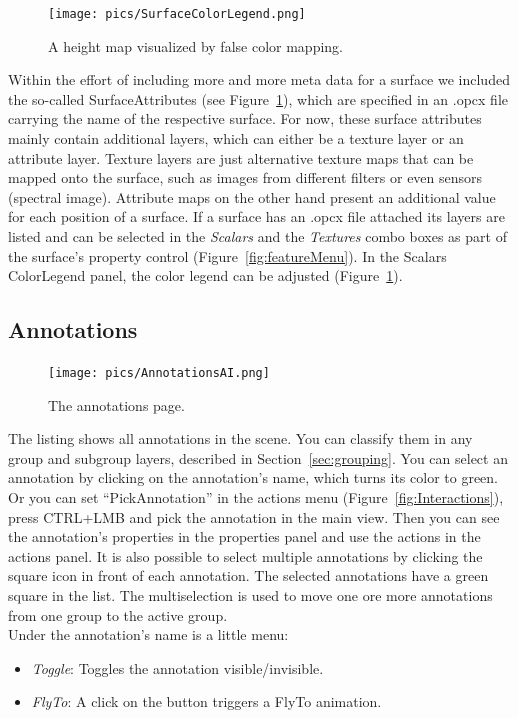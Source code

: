 \begin{figure}[h]
    	\centering
    		\texttt{[image: pics/SurfaceColorLegend.png]}
    	\caption[Surface Color Legend]{A height map visualized by false color mapping.}
    	\label{fig:surfaceColorLegend}
   \end{figure}
	
Within the effort of including more and more meta data for a surface we included the so-called SurfaceAttributes (see Figure~\ref{fig:surfaceColorLegend}),
which are specified in an .opcx file carrying the name of the respective surface.
For now, these surface attributes mainly contain additional layers, which can either be a texture layer or an attribute layer.
Texture layers are just alternative texture maps that can be mapped onto the surface, such as images from different filters or even sensors (spectral image). 
Attribute maps on the other hand present an additional value for each position of a surface. 
If a surface has an .opcx file attached its layers are listed and can be selected in the \textit{Scalars} and the \textit{Textures} combo boxes as part of the surface's property control (Figure~\ref{fig:featureMenu}). 
In the Scalars ColorLegend panel, the color legend can be adjusted (Figure~\ref{fig:surfaceColorLegend}).

\newpage
\subsection{Annotations}
\label{sec:annotations}

\begin{figure}[h]
    	\centering
    		\texttt{[image: pics/AnnotationsAI.png]}
    	\caption[Viewer Features Annotations]{The annotations page.}
    	\label{fig:annoProps}
   \end{figure}
	
The listing shows all annotations in the scene. You can classify them in any group and subgroup layers, described in Section~\ref{sec:grouping}.
You can select an annotation by clicking on the annotation's name, which turns its color to green. Or you can set ``PickAnnotation'' in the actions menu (Figure~\ref{fig:Interactions}), press CTRL+LMB and pick the annotation in the main view. Then you can see the annotation's properties in the properties panel and use the actions in the actions panel. 
It is also possible to select multiple annotations by clicking the square icon in front of each annotation. The selected annotations have a green square in the list. The multiselection is used to move one ore more annotations from one group to the active group.\\
Under the annotation's name is a little menu:
\begin{itemize}
  \item \textit{Toggle}: Toggles the annotation visible/invisible.
	\item \textit{FlyTo}: A click on the button triggers a FlyTo animation.
\end{itemize}

